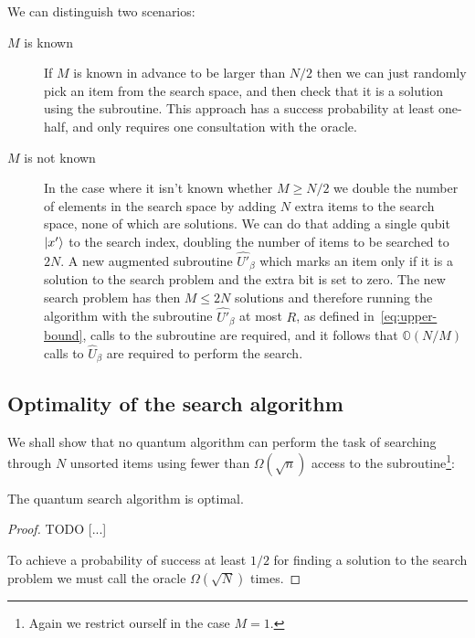 We can distinguish two scenarios:
\begin{description}
   \item[$M$ is known] If $M$ is known in advance to be larger than $N/2$ then we can just randomly pick an item from the search space, and then check that it is a solution using the subroutine. This approach has a success probability at least one-half, and only requires one consultation with the oracle.
   \item[$M$ is not known] In the case where it isn't known whether $M\geq N/2$ we double the number of elements in the search space by adding $N$ extra items to the search space, none of which are solutions. We can do that adding a single qubit $\ket{x'}$ to the search index, doubling the number of items to be searched to $2N$. A new augmented subroutine $\hat{U'}_\beta$ which marks an item only if it is a solution to the search problem and the extra bit is set to zero. The new search problem has then $M \leq 2N$ solutions and therefore running the algorithm with the subroutine $\hat{U'}_\beta$ at most $R$, as defined in~\ref{eq:upper-bound}, calls to the subroutine are required, and it follows that $\mathbb{O}(N/M)$ calls to $\hat{U}_\beta$ are required to perform the search.
\end{description}
\subsection{Optimality of the search algorithm}
We shall show that no quantum algorithm can perform the task of searching through $N$ unsorted items using fewer than $\Omega(\sqrt{n})$ access to the subroutine\footnote{Again we restrict ourself in the case $M=1$.}:
\begin{theorem}
The quantum search algorithm is optimal. 
\end{theorem}
\begin{proof}
TODO [...]

To achieve a probability of success at least $1/2$ for finding a solution to the search problem we must call the oracle $\Omega(\sqrt{N})$ times.
\end{proof}

